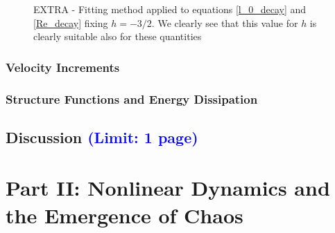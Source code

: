 \documentclass[11pt,titlepage]{article}
\begin{document}
\begin{center}
	\begin{figure} [h]
		\centering
		\hspace{8mm}
		\caption{EXTRA - Fitting method applied to equations \ref{l_0_decay} and \ref{Re_decay} fixing $h=-3/2$. We clearly see that this value for $h$ is clearly suitable also for these quantities}
		\label{fig9}
	\end{figure}
\end{center}

\subsubsection{Velocity Increments}

\subsubsection{Structure Functions and Energy Dissipation}

\subsection{Discussion \textcolor{blue}{(Limit: 1 page)}} %

\newpage
\section{Part II: Nonlinear Dynamics and the Emergence of Chaos}
\end{document}

